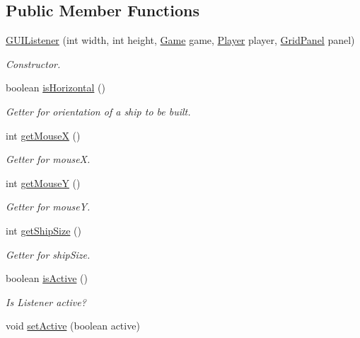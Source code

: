 \subsection*{Public Member Functions}
\begin{DoxyCompactItemize}
\item 
\hyperlink{classGUIListener_af4885004ac07dbdcc72cde2b7c0cde14}{G\+U\+I\+Listener} (int width, int height, \hyperlink{classGame}{Game} game, \hyperlink{classPlayer}{Player} player, \hyperlink{classGridPanel}{Grid\+Panel} panel)
\begin{DoxyCompactList}\small\item\em Constructor. \end{DoxyCompactList}\item 
boolean \hyperlink{classGUIListener_af6a1761ae16169e68eadc58cf7051bea}{is\+Horizontal} ()
\begin{DoxyCompactList}\small\item\em Getter for orientation of a ship to be built. \end{DoxyCompactList}\item 
int \hyperlink{classGUIListener_a11a624deb04ae126517f37e6b1883aad}{get\+MouseX} ()
\begin{DoxyCompactList}\small\item\em Getter for mouseX. \end{DoxyCompactList}\item 
int \hyperlink{classGUIListener_ad8f1ceb49938fc6c5869202ac1383b74}{get\+MouseY} ()
\begin{DoxyCompactList}\small\item\em Getter for mouseY. \end{DoxyCompactList}\item 
int \hyperlink{classGUIListener_a4c107528ebd4f160674ecbaf9b125bf9}{get\+Ship\+Size} ()
\begin{DoxyCompactList}\small\item\em Getter for ship\+Size. \end{DoxyCompactList}\item 
boolean \hyperlink{classGUIListener_a0559c02a1f4b20ba00b3195d76de05d4}{is\+Active} ()
\begin{DoxyCompactList}\small\item\em Is Listener active? \end{DoxyCompactList}\item 
void \hyperlink{classGUIListener_a2834f4c5089485e247184aba22ffa36e}{set\+Active} (boolean active)\hypertarget{classGUIListener_a2834f4c5089485e247184aba22ffa36e}{}\label{classGUIListener_a2834f4c5089485e247184aba22ffa36e}


\end{DoxyCompactItemize}
